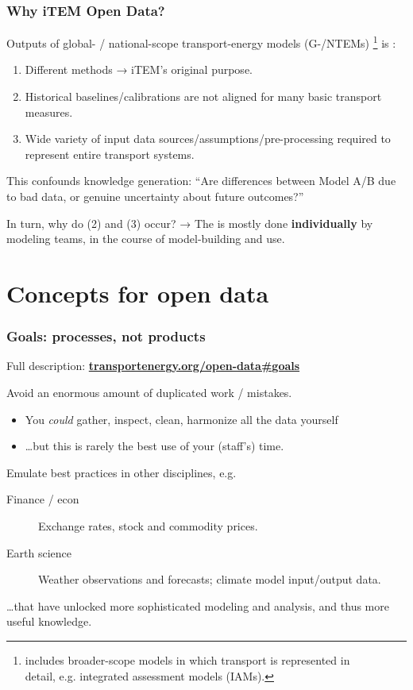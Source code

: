 \documentclass[12pt,aspectratio=169]{beamer}
\begin{document}
\begin{frame}
\frametitle{Why iTEM Open Data?}

Outputs of global- / national-scope transport-energy models (G-/NTEMs)%
\footnote{includes broader-scope models in which transport is represented in\\\hspace{25mm} detail, e.g. integrated assessment models (IAMs).}
is :
\begin{enumerate}
  \item Different methods → iTEM's original purpose.
  \item Historical baselines/calibrations are not aligned for many basic transport measures.
  \item Wide variety of input data sources/assumptions/pre-processing required to represent entire transport systems.
\end{enumerate}
\smallskip
This confounds knowledge generation: “Are differences between Model A/B due to bad data, or genuine uncertainty about future outcomes?”

\medskip
In turn, why do (2) and (3) occur? → The  is mostly done \textbf{individually} by modeling teams, in the course of model-building and use.

\end{frame}

\section{Concepts for open data}

\begin{frame}
\frametitle{Goals: processes, not products}

Full description: \href{https://transportenergy.org/open-data\#goals}{\bfseries transportenergy.org/open-data\#goals}

\bigskip
Avoid an enormous amount of duplicated work / mistakes.
\begin{itemize}
  \item You \emph{could} gather, inspect, clean, harmonize all the data yourself
  \item …but this is rarely the best use of your (staff's) time.
\end{itemize}

\bigskip
Emulate best practices in other disciplines, e.g.
\begin{description}
  \item [Finance / econ] Exchange rates, stock and commodity prices.
  \item [Earth science] Weather observations and forecasts; climate model input/output data.
\end{description}

\smallskip
…that have unlocked more sophisticated modeling and analysis, and thus more useful knowledge.

\end{frame}
\end{document}
